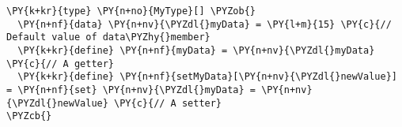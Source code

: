 \begin{Verbatim}[commandchars=\\\{\}]
\PY{k+kr}{type} \PY{n+no}{MyType}[] \PYZob{}
  \PY{n+nf}{data} \PY{n+nv}{\PYZdl{}myData} = \PY{l+m}{15} \PY{c}{// Default value of data\PYZhy{}member}
  \PY{k+kr}{define} \PY{n+nf}{myData} = \PY{n+nv}{\PYZdl{}myData} \PY{c}{// A getter}
  \PY{k+kr}{define} \PY{n+nf}{setMyData}[\PY{n+nv}{\PYZdl{}newValue}] = \PY{n+nf}{set} \PY{n+nv}{\PYZdl{}myData} = \PY{n+nv}{\PYZdl{}newValue} \PY{c}{// A setter}
\PYZcb{}
\end{Verbatim}
